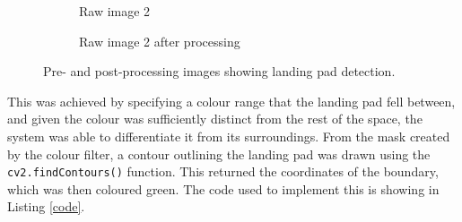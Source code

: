 \begin{figure}[H]
\begin{subfigure}[t]{.5\textwidth}
  \caption{Raw image 2}
\end{subfigure}%
\begin{subfigure}[t]{.5\textwidth}
  \centering
  \caption{Raw image 2 after processing}
\end{subfigure}
\caption{Pre- and post-processing images showing landing pad detection.}
\label{fig:landing_detection}
\end{figure}

This was achieved by specifying a colour range that the landing pad fell between, and given the colour was sufficiently distinct from the rest of the space, the system was able to differentiate it from its surroundings. From the mask created by the colour filter, a contour outlining the landing pad was drawn using the \texttt{cv2.findContours()} function. This returned the coordinates of the boundary, which was then coloured green. The code used to implement this is showing in Listing \ref{code}.

